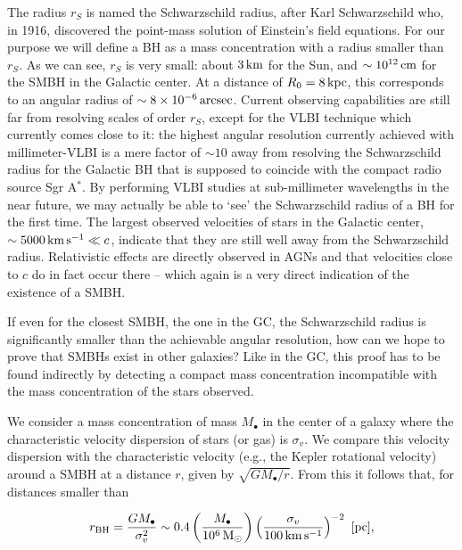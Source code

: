 \documentclass[a4paper,11pt]{article}
\begin{document}
{\noindent}The radius $r_S$ is named the Schwarzschild radius, after Karl Schwarzschild who, in 1916, discovered the point-mass solution of Einstein's field equations. For our purpose we will define a BH as a mass concentration with a radius smaller than $r_S$. As we can see, $r_S$ is very small: about $3\,{\rm km}$ for the Sun, and $\sim10^{12}\,{\rm cm}$ for the SMBH in the Galactic center. At a distance of $R_0=8\,{\rm kpc}$, this corresponds to an angular radius of $\sim8\times10^{-6}\,{\rm arcsec}$. Current observing capabilities are still far from resolving scales of order $r_S$, except for the VLBI technique which currently comes close to it: the highest angular resolution currently achieved with millimeter-VLBI is a mere factor of $\sim10$ away from resolving the Schwarzschild radius for the Galactic BH that is supposed to coincide with the compact radio source Sgr A$^*$. By performing VLBI studies at sub-millimeter wavelengths in the near future, we may actually be able to `see' the Schwarzschild radius of a BH for the first time. The largest observed velocities of stars in the Galactic center,   $\sim5000\,{\rm km\,s^{-1}}\ll c$, indicate that they are still well away from the Schwarzschild radius. Relativistic effects are directly observed in AGNs and that velocities close to $c$ do in fact occur there -- which again is a very direct indication of the existence of a SMBH.

{\noindent}If even for the closest SMBH, the one in the GC, the Schwarzschild radius is significantly smaller than the achievable angular resolution, how can we hope to prove that SMBHs exist in other galaxies? Like in the GC, this proof has to be found indirectly by detecting a compact mass concentration incompatible with the mass concentration of the stars observed.

{\noindent}We consider a mass concentration of mass $M_\bullet$ in the center of a galaxy where the characteristic velocity dispersion of stars (or gas) is $\sigma_v$. We compare this velocity dispersion with the characteristic velocity (e.g., the Kepler rotational velocity) around a SMBH at a distance $r$, given by $\sqrt{GM_\bullet/r}$. From this it follows that, for distances smaller than

\begin{align*}
    r_\mathrm{BH} = \frac{GM_\bullet}{\sigma_v^2} \sim 0.4\left(\frac{M_\bullet}{10^6\,{\rm M_\odot}}\right)\left(\frac{\sigma_v}{100\,{\rm km\,s^{-1}}}\right)^{-2} ~ [{\rm pc}],
\end{align*}
\end{document}
